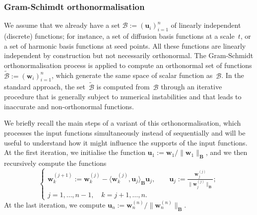 \documentclass[acmtog,authorversion]{acmart}
\begin{document}
\subsubsection{Gram-Schimdt orthonormalisation\label{sec:GM-ORHTONORMALIZAION}}
We assume that we already have a set \mbox{$\mathcal{B}:=(\mathbf{u}_{i})_{i=1}^{n}$} of linearly independent (discrete) functions; for instance, a set of diffusion basis functions at a scale~$t$, or a set of harmonic basis functions at seed points. All these functions are linearly independent by construction but not necessarily orthonormal. The Gram-Schmidt orthonormalisation process is applied to compute an orthonormal set of functions \mbox{$\tilde{\mathcal{B}}:=(\mathbf{w}_{i})_{i=1}^{n}$}, which generate the same space of scalar function as~$\mathcal{B}$. In the standard approach, the set~$\tilde{\mathcal{B}}$ is computed from~$\mathcal{B}$ through an iterative procedure that is generally subject to numerical instabilities and that leads to inaccurate and non-orthonormal functions.

We briefly recall the main steps of a variant of this orthonormalisation, which processes the input functions simultaneously instead of sequentially and will be useful to understand how it might influence the supports of the input functions. At the first iteration, we initialise the function \mbox{$\mathbf{u}_{1}:=\mathbf{w}_{1}/\|\mathbf{w}_{1}\|_{\mathbf{B}}$}, and we then recursively compute the functions
%
\begin{equation}\label{eq:ORTH-VECTORS}
\left\{
\begin{array}{l}
\mathbf{w}_{k}^{(j+1)}:=\mathbf{w}_{k}^{(j)}-\langle\mathbf{w}_{k}^{(j)},\mathbf{u}_{j}\rangle_{\mathbf{B}}\mathbf{u}_{j},\qquad
\mathbf{u}_{j}
:=\frac{\mathbf{w}_{j}^{(j)}}{\|\mathbf{w}_{j}^{(j)}\|_{\mathbf{B}}};\\
j=1,\ldots,n-1,\quad k=j+1,\ldots,n.
\end{array}
\right.
\end{equation}
%
At the last iteration, we compute \mbox{$\mathbf{u}_{n}:=\mathbf{w}_{n}^{(n)}/\|\mathbf{w}_{n}^{(n)}\|_{\mathbf{B}}$}. 
\end{document}
